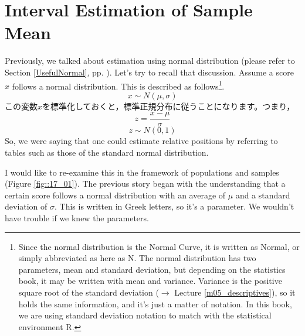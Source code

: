 \documentclass{ltjsbook}
\begin{document}
\section{Interval Estimation of Sample Mean}
Previously, we talked about estimation using normal distribution (please refer to Section \ref{UsefulNormal}, pp. \pageref{UsefulNormal}). Let's try to recall that discussion.
Assume a score $x$ follows a normal distribution. This is described as follows\footnote{Since the normal distribution is the Normal Curve, it is written as Normal, or simply abbreviated as here as N. The normal distribution has two parameters, mean and standard deviation, but depending on the statistics book, it may be written with mean and variance. Variance is the positive square root of the standard deviation ($\to$ Lecture \ref{m05_descriptives}), so it holds the same information, and it's just a matter of notation. In this book, we are using standard deviation notation to match with the statistical environment R.}.
\[ x\sim N(\mu,\sigma) \]
この変数$x$を標準化しておくと，標準正規分布に従うことになります。つまり，
\begin{equation}
	\label{ex::SampleMean}
	z = \frac{x-\mu}{\sigma}
\end{equation}
\[ z \sim N(0,1) \]
So, we were saying that one could estimate relative positions by referring to tables such as those of the standard normal distribution.

I would like to re-examine this in the framework of populations and samples (Figure \ref{fig::17_01}). The previous story began with the understanding that a certain score follows a normal distribution with an average of $\mu$ and a standard deviation of $\sigma$. This is written in Greek letters, so it's a parameter. We wouldn't have trouble if we knew the parameters.
\end{document}
